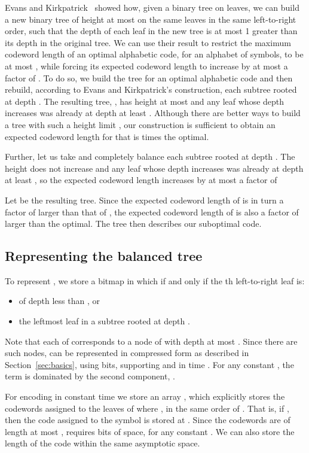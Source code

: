 \documentclass[preprint,12pt]{elsarticle}
\begin{document}
Evans and Kirkpatrick~\cite{EK04} showed how, given a binary tree on  leaves, we can build a new binary tree of height at most  on the same leaves in the same left-to-right order, such that the depth of each leaf in the new tree is at most 1 greater than its depth in the original tree. We can use their result to restrict the maximum codeword length of an optimal alphabetic code, for an alphabet of  symbols, to be at most , while forcing its expected codeword length to increase by at most a factor of . To do so, we build the tree  for an optimal alphabetic code and then rebuild, according to Evans and Kirkpatrick's construction, each subtree rooted at depth .  The resulting tree, , has height at most  and any leaf whose depth increases was already at depth at least .
Although there are better ways to build a tree  with such a height 
limit \cite{Wes76,Ita76}, our construction is sufficient to obtain an 
expected codeword length for  that is  times the optimal.

Further, let us take  and completely balance each subtree rooted at depth .
The height does not increase and any leaf whose depth increases was already at depth at least , so the expected codeword length increases by at most a factor of

Let  be the resulting tree.  Since the expected codeword length of  is in turn a factor of  larger than that of , the expected codeword length of  is also a factor of  larger than
the optimal. The tree  then describes our suboptimal code.

\subsection{Representing the balanced tree}

To represent , we store a bitmap  in which  if and only if the th left-to-right leaf is:
\begin{itemize}
\item of depth less than , or 
\item the leftmost leaf in a subtree rooted at depth .  
\end{itemize}
Note that each  of  corresponds to a node of  with depth at most
. Since there are
 such nodes,  can be 
represented in compressed form as described in Section~\ref{sec:basics}, using
 bits,
supporting  and  in time . For any constant , the
term  is dominated by the second
component, .

For encoding in constant time we store an array , which explicitly stores the codewords assigned to 
the leaves of  where , in the same order of . That is, if
, then the code assigned to the symbol  is stored at . Since the codewords are of length at most ,  requires 
 bits of space, for any constant . We can
also store the length of the code within the same asymptotic space.
\end{document}
